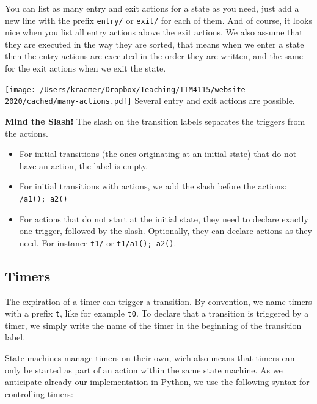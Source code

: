 \documentclass[10pt, twoside, twocolumn]{book}
\providecommand{\tightlist}{%
  \setlength{\itemsep}{0pt}\setlength{\parskip}{0pt}}
\renewcommand{\caption}{}
\let\origfigure=\figure
\let\endorigfigure=\endfigure
\renewenvironment{figure}[1][]{%
  \origfigure[H]
}{%
  \endorigfigure
}
\begin{document}
You can list as many entry and exit actions for a state as you need,
just add a new line with the prefix \texttt{entry/} or \texttt{exit/}
for each of them. And of course, it looks nice when you list all entry
actions above the exit actions. We also assume that they are executed in
the way they are sorted, that means when we enter a state then the entry
actions are executed in the order they are written, and the same for the
exit actions when we exit the state.

\begin{figure}[htbp]
\begin{center}
\texttt{[image: /Users/kraemer/Dropbox/Teaching/TTM4115/website 2020/cached/many-actions.pdf]}%
\caption{Several entry and exit actions are possible.}
\label{default}
\end{center}
\end{figure}
\textbf{Mind the Slash!} The slash on the transition labels separates
the triggers from the actions.

\begin{itemize}
\tightlist
\item
  For initial transitions (the ones originating at an initial state)
  that do not have an action, the label is empty.
\item
  For initial transitions with actions, we add the slash before the
  actions: \texttt{/a1();\ a2()}
\item
  For actions that do not start at the initial state, they need to
  declare exactly one trigger, followed by the slash. Optionally, they
  can declare actions as they need. For instance \texttt{t1/} or
  \texttt{t1/a1();\ a2()}.
\end{itemize}

\hypertarget{timers}{%
\subsection{Timers}\label{timers}}

The expiration of a timer can trigger a transition. By convention, we
name timers with a prefix \texttt{t}, like for example \texttt{t0}. To
declare that a transition is triggered by a timer, we simply write the
name of the timer in the beginning of the transition label.

State machines manage timers on their own, wich also means that timers
can only be started as part of an action within the same state machine.
As we anticipate already our implementation in Python, we use the
following syntax for controlling timers:
\end{document}
